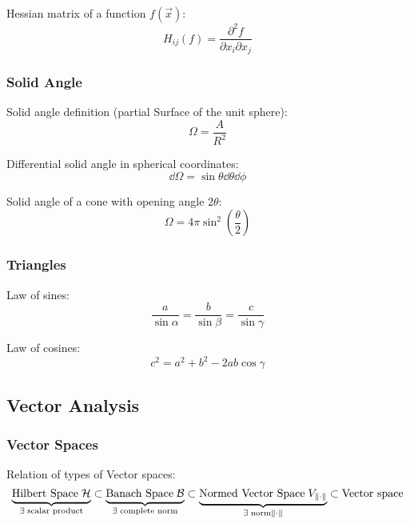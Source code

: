			\noindent
			Hessian matrix of a function $f(\vec{x})$:
			\begin{equation}
				H_{ij}(f) = \frac{\partial^2 f}{\partial x_i \partial x_j}
			\end{equation}

		\subsubsection{Solid Angle}
			\noindent
			Solid angle definition (partial Surface of the unit sphere):
			\begin{equation}
				\Omega = \frac{A}{R^2}
			\end{equation}

			\noindent
			Differential solid angle in spherical coordinates:
			\begin{equation}
				\dd \Omega = \sin\theta\dd{\theta} \dd{\phi}
			\end{equation}

			\noindent
			Solid angle of a cone with opening angle $2\theta$:
			\begin{equation}
				\Omega = 4\pi\sin^2\left(\frac{\theta}{2}\right)
			\end{equation}

		\subsubsection{Triangles}
			\noindent
			Law of sines:
			\begin{equation}
				\frac{a}{\sin\alpha} = \frac{b}{\sin\beta} = \frac{c}{\sin\gamma}
			\end{equation}

			\noindent
			Law of cosines:
			\begin{equation}
				c^2 = a^2 + b^2 -2ab \cos\gamma
			\end{equation}


	\subsection{Vector Analysis}
		\subsubsection{Vector Spaces}
			Relation of types of Vector spaces:
			\begin{equation}
				\underbrace{\text{Hilbert Space}\;\mathcal{H}}_{\exists\; \text{scalar product}} \subset \underbrace{\text{Banach Space}\;\mathcal{B}}_{\exists\; \text{complete norm}} \subset \underbrace{\text{Normed Vector Space}\;V_{\norm{\cdot}}}_{\exists\; \text{norm} \norm{\cdot} } \subset \text{Vector space}
			\end{equation}


